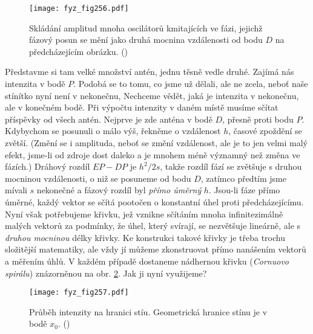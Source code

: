 {    \begin{figure}[ht!] %
      \centering
      \texttt{[image: fyz\_fig256.pdf]}
      \caption{Skládání amplitud mnoha oscilátorů kmitajících ve fázi, jejichž fázový posun se mění 
              jako druhá mocnina vzdálenosti od bodu \(D\) na předcházejícím obrázku.
               (\cite[s.~389]{Feynman01})}
      \label{fyz:fig256}
    \end{figure}
    
    Představme si tam velké množství antén, jednu těsně vedle druhé. Zajímá nás intenzita v bodě 
    \(P\). Podobá se to tomu, co jsme už dělali, ale ne zcela, neboť naše stínítko nyní není v 
    nekonečnu, Nechceme vědět, jaká je intenzita v nekonečnu, ale v konečném bodě. Při výpočtu 
    intenzity v daném místě musíme sčítat příspěvky od všech antén. Nejprve je zde anténa v bodě 
    \(D\), přesně proti bodu \(P\). Kdybychom se posunuli o málo výš, řekněme o vzdálenost \(h\), 
    časové zpoždění se zvětší. (Změní se i amplituda, neboť se změní vzdálenost, ale je to jen 
    velmi malý efekt, jsme-li od zdroje dost daleko a je mnohem méně významný než změna ve fázích.) 
    Dráhový rozdíl \(EP - DP\) je \(h^2/2s\), takže rozdíl fází se zvětšuje s druhou mocninou 
    vzdálenosti, o niž se posuneme od bodu \(D\), zatímco předtím jsme mívali \(s\) nekonečné a 
    fázový rozdíl byl \emph{přímo úměrný} \(h\). Jsou-li fáze přímo úměrné, každý vektor se sčítá 
    pootočen o konstantní úhel proti předcházejícímu. Nyní však potřebujeme křivku, jež vznikne 
    sčítáním mnoha infinitezimálně malých vektorů za podmínky, že úhel, který svírají, se 
    nezvětšuje lineárně, ale s \emph{druhou mocninou} délky křivky. Ke konstrukci takové křivky je 
    třeba trochu složitější matematiky, ale vždy jí můžeme zkonstruovat přímo nanášením vektorů a 
    měřením úhlů. V každém případě dostaneme nádhernou křivku (\emph{Cornuovo spirálu}) znázorněnou 
    na obr. \ref{fyz:fig257}. Jak ji nyní využijeme?

    \begin{figure}[ht!] %
      \centering
      \texttt{[image: fyz\_fig257.pdf]}
      \caption{Průběh intenzity na hranici stíu. Geometrická hranice stínu je v bodě \(x_0\).
               (\cite[s.~403]{Feynman01})}
      \label{fyz:fig257}
    \end{figure}

}
